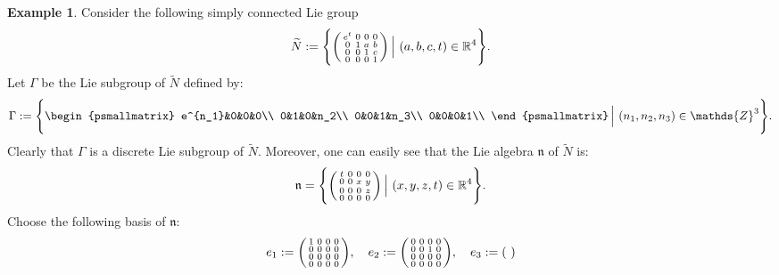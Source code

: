 \documentclass[preprint,12pt,1p]{elsarticle}
\theoremstyle{plain}
\theoremstyle{definition}
\newtheorem{example}[theorem]{Example}
\newcommand{\rel}{\mathbb{R}}
\newcommand{\intg}{\mathds{Z}}
\numberwithin{equation}{section}
\newcommand{\nl}{\mathfrak{n}}
\begin{document}
\begin{example}\label{rriF1}
Consider the following simply connected Lie group
\begin{equation*}
\widetilde{N}:=\Bigg\{\begin{psmallmatrix}
e^t&0&0&0\\
0&1&a&b\\
0&0&1&c\\
0&0&0&1\\
\end{psmallmatrix}\,\Big|\,\,(a,b,c,t)\in\rel^4\Bigg\}.
\end{equation*}
Let $\Gamma$ be the Lie subgroup of $\widetilde{N}$ defined by: 
\begin{equation*}
\Gamma:=\Bigg\{\begin{psmallmatrix}
e^{n_1}&0&0&0\\
0&1&0&n_2\\
0&0&1&n_3\\
0&0&0&1\\
\end{psmallmatrix}\,\Big|\,\,(n_1,n_2,n_3)\in\intg^3\Bigg\}.
\end{equation*}
Clearly that $\Gamma$ is a discrete Lie subgroup of $\widetilde{N}$. Moreover, one can easily see that the Lie algebra $\nl$ of $\widetilde{N}$ is:
\begin{equation*}
\nl=\Bigg\{\begin{psmallmatrix}
t&0&0&0\\
0&0&x&y\\
0&0&0&z\\
0&0&0&0\\
\end{psmallmatrix}\,\Big|\,\,(x,y,z,t)\in\rel^4\Bigg\}.
\end{equation*}
Choose the following basis of $\nl$:
\begin{equation*}
e_1:=\begin{psmallmatrix}
1&0&0&0\\
0&0&0&0\\
0&0&0&0\\
0&0&0&0\\
\end{psmallmatrix},\quad e_2:=\begin{psmallmatrix}
0&0&0&0\\
0&0&1&0\\
0&0&0&0\\
0&0&0&0\\
\end{psmallmatrix},\quad e_3:=\begin{psmallmatrix}

\end{psmallmatrix}
\end{equation*}
\end{example}
\end{document}
